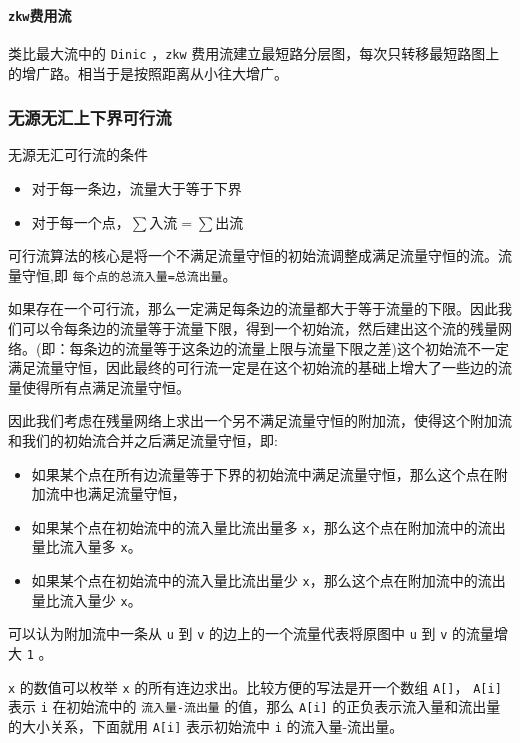 \documentclass[UTF-8]{ctexart}
\begin{document}
	\paragraph{\texttt{zkw}费用流} 类比最大流中的 \texttt{Dinic} ，\texttt{zkw} 费用流建立最短路分层图，每次只转移最短路图上的增广路。相当于是按照距离从小往大增广。
	\subsubsection{无源无汇上下界可行流}
	无源无汇可行流的条件 
	\begin{itemize}
		\item 对于每一条边，流量大于等于下界  
		\item 对于每一个点，$\sum \mbox{入流}=\sum \mbox{出流}$
	\end{itemize} 
	
	可行流算法的核心是将一个不满足流量守恒的初始流调整成满足流量守恒的流。流量守恒,即 \texttt{每个点的总流入量=总流出量}。  
	
	如果存在一个可行流，那么一定满足每条边的流量都大于等于流量的下限。因此我们可以令每条边的流量等于流量下限，得到一个初始流，然后建出这个流的残量网络。(即：每条边的流量等于这条边的流量上限与流量下限之差)这个初始流不一定满足流量守恒，因此最终的可行流一定是在这个初始流的基础上增大了一些边的流量使得所有点满足流量守恒。  
	
	因此我们考虑在残量网络上求出一个另不满足流量守恒的附加流，使得这个附加流和我们的初始流合并之后满足流量守恒，即:  
	
	\begin{itemize}
		\item 如果某个点在所有边流量等于下界的初始流中满足流量守恒，那么这个点在附加流中也满足流量守恒，
		\item 如果某个点在初始流中的流入量比流出量多 \texttt{x}，那么这个点在附加流中的流出量比流入量多 \texttt{x}。  
		\item 如果某个点在初始流中的流入量比流出量少 \texttt{x}，那么这个点在附加流中的流出量比流入量少 \texttt{x}。
	\end{itemize}
	
	可以认为附加流中一条从  \texttt{u} 到 \texttt{v} 的边上的一个流量代表将原图中 \texttt{u} 到 \texttt{v} 的流量增大 \texttt{1} 。  
	
	 \texttt{x} 的数值可以枚举 \texttt{x} 的所有连边求出。比较方便的写法是开一个数组  \texttt{A[]}， \texttt{A[i]} 表示 \texttt{i} 在初始流中的 \texttt{流入量-流出量} 的值，那么 \texttt{A[i]} 的正负表示流入量和流出量的大小关系，下面就用 \texttt{A[i]} 表示初始流中 \texttt{i} 的流入量-流出量。  
	
\end{document}
